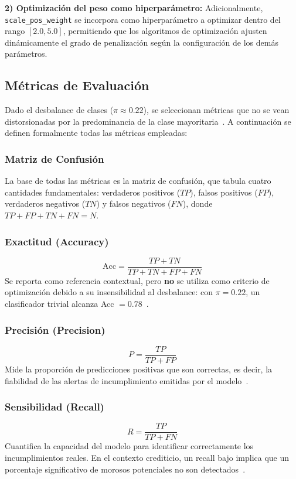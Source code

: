 \documentclass[journal]{IEEEtran}
\begin{document}
\textbf{2) Optimización del peso como hiperparámetro:} Adicionalmente, \texttt{scale\_pos\_weight} se incorpora como hiperparámetro a optimizar dentro del rango $[2.0, 5.0]$, permitiendo que los algoritmos de optimización ajusten dinámicamente el grado de penalización según la configuración de los demás parámetros.

\subsection{Métricas de Evaluación}
\label{sec:metrics}

Dado el desbalance de clases ($\pi \approx 0.22$), se seleccionan métricas que no se vean distorsionadas por la predominancia de la clase mayoritaria~\cite{he2009, davis2006, saito2015}. A continuación se definen formalmente todas las métricas empleadas:

\subsubsection{Matriz de Confusión}
La base de todas las métricas es la matriz de confusión, que tabula cuatro cantidades fundamentales: verdaderos positivos ($TP$), falsos positivos ($FP$), verdaderos negativos ($TN$) y falsos negativos ($FN$), donde $TP + FP + TN + FN = N$.

\subsubsection{Exactitud (Accuracy)}
\begin{equation}
    \text{Acc} = \frac{TP + TN}{TP + TN + FP + FN}
    \label{eq:acc}
\end{equation}
Se reporta como referencia contextual, pero \textbf{no} se utiliza como criterio de optimización debido a su insensibilidad al desbalance: con $\pi = 0.22$, un clasificador trivial alcanza Acc $= 0.78$~\cite{he2009}.

\subsubsection{Precisión (Precision)}
\begin{equation}
    P = \frac{TP}{TP + FP}
    \label{eq:prec}
\end{equation}
Mide la proporción de predicciones positivas que son correctas, es decir, la fiabilidad de las alertas de incumplimiento emitidas por el modelo~\cite{hand1997}.

\subsubsection{Sensibilidad (Recall)}
\begin{equation}
    R = \frac{TP}{TP + FN}
    \label{eq:recall}
\end{equation}
Cuantifica la capacidad del modelo para identificar correctamente los incumplimientos reales. En el contexto crediticio, un recall bajo implica que un porcentaje significativo de morosos potenciales no son detectados~\cite{thomas2000}.
\end{document}
